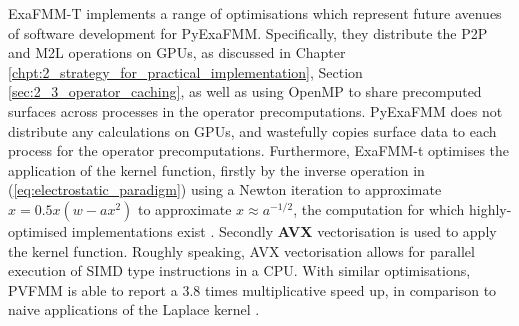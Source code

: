 ExaFMM-T implements a range of optimisations which represent future avenues
of software development for \gls{PyExaFMM}. Specifically, they distribute the
\gls{P2P} and \gls{M2L} operations on \gls{GPU}s, as discussed in Chapter
\ref{chpt:2_strategy_for_practical_implementation},
Section \ref{sec:2_3_operator_caching}, as well as using \gls{OpenMP} to share
precomputed surfaces across processes in the operator precomputations.
\gls{PyExaFMM} does not distribute any calculations on \gls{GPU}s, and
wastefully copies surface data to each process for the operator precomputations.
Furthermore, ExaFMM-t optimises the application of the kernel function,
firstly by the inverse operation in (\ref{eq:electrostatic_paradigm}) using a Newton
iteration to approximate $x = 0.5x(w-ax^2)$ to approximate $x \approx a ^{-1/2}$,
the computation for which highly-optimised implementations exist
\cite{Lomont:2003, sqrt}. Secondly \textbf{\gls{AVX}} vectorisation is used
to apply the kernel function. Roughly speaking, \gls{AVX} vectorisation allows
for parallel execution of \gls{SIMD} type instructions in a \gls{CPU}. With similar
optimisations, PVFMM is able to report a 3.8 times multiplicative speed up, in
comparison to naive applications of the Laplace kernel \cite{Malhotra:2015:CCP}.

